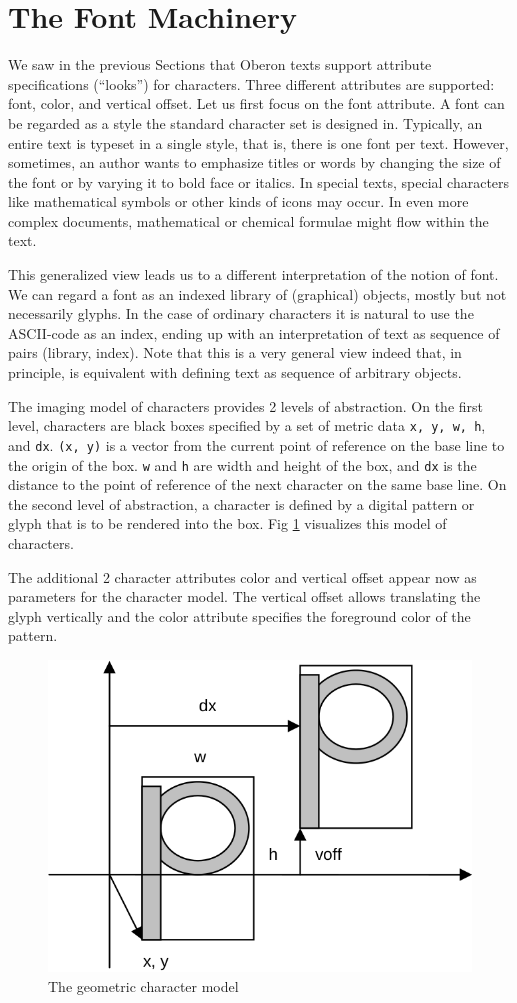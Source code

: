 \section{The Font Machinery}
\label{sec:fontmachinery}
We saw in the previous Sections that Oberon texts support attribute specifications (“looks”) for
characters. Three different attributes are supported: font, color, and vertical offset. Let us first
focus on the font attribute. A font can be regarded as a style the standard character set is designed in.
Typically, an entire text is typeset in a single style, that is, there is one font per text. However,
sometimes, an author wants to emphasize titles or words by changing the size of the font or by
varying it to bold face or italics. In special texts, special characters like mathematical symbols or
other kinds of icons may occur. In even more complex documents, mathematical or chemical formulae
might flow within the text.

This generalized view leads us to a different interpretation of the notion of font. We can regard a
font as an indexed library of (graphical) objects, mostly but not necessarily glyphs. In the case of
ordinary characters it is natural to use the ASCII-code as an index, ending up with an interpretation
of text as sequence of pairs (library, index). Note that this is a very general view indeed that, in
principle, is equivalent with defining text as sequence of arbitrary objects.

The imaging model of characters provides 2 levels of abstraction. On the first level, characters are
black boxes specified by a set of metric data \verb|x, y, w, h|, and \verb|dx|. \verb|(x, y)| is a
vector from the current point of reference on the base line to the origin of the box. \verb|w| and
\verb|h| are width and height of the box, and \verb|dx| is the distance to the point of reference of
the next character on the same base line. On the second level of abstraction, a character is defined
by a digital pattern or glyph that is to be rendered into the box. Fig \ref{fig:character} visualizes
this model of characters.

The additional 2 character attributes color and vertical offset appear now as parameters for the
character model. The vertical offset allows translating the glyph vertically and the color attribute
specifies the foreground color of the pattern.
\begin{figure}[h!]
  \label{fig:character}
  \centering
  \includegraphics[width=.7\textwidth]{i/i}
  \caption{The geometric character model}
\end{figure}

